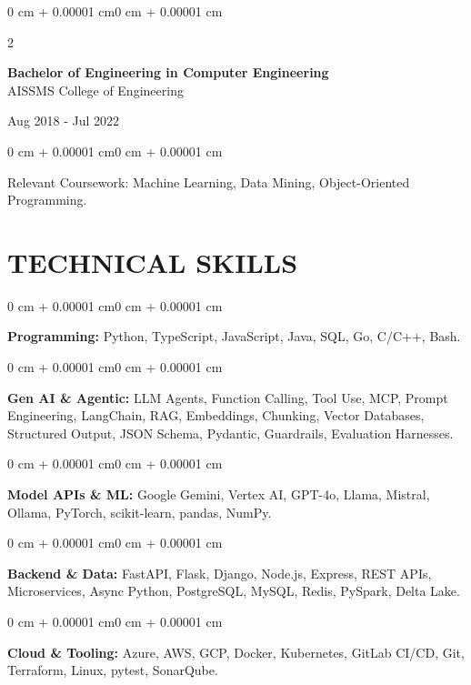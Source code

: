 \documentclass[10pt, letterpaper]{article}
\newenvironment{onecolentry}{
    \begin{adjustwidth}{0 cm + 0.00001 cm}{0 cm + 0.00001 cm}
}{
    \end{adjustwidth}
}
\newenvironment{twocolentry}[2][]{
    \onecolentry
    \def\secondColumn{#2}
    \setcolumnwidth{\fill, 4.5 cm}
    \begin{paracol}{2}
}{
    \switchcolumn \raggedleft \secondColumn
    \end{paracol}
    \endonecolentry
}
\begin{document}
\begin{twocolentry}{
    Aug 2018 - Jul 2022
}
    \textbf{Bachelor of Engineering in Computer Engineering} \\
    AISSMS College of Engineering
\end{twocolentry}
\begin{onecolentry}
Relevant Coursework: Machine Learning, Data Mining, Object-Oriented Programming.
\end{onecolentry}
\section{TECHNICAL SKILLS}
\begin{onecolentry}
\textbf{Programming:} Python, TypeScript, JavaScript, Java, SQL, Go, C/C++, Bash.
\end{onecolentry}
\vspace{0.06 cm}
\begin{onecolentry}
\textbf{Gen AI \& Agentic:} LLM Agents, Function Calling, Tool Use, MCP, Prompt Engineering, LangChain, RAG, Embeddings, Chunking, Vector Databases, Structured Output, JSON Schema, Pydantic, Guardrails, Evaluation Harnesses.
\end{onecolentry}
\vspace{0.06 cm}
\begin{onecolentry}
\textbf{Model APIs \& ML:} Google Gemini, Vertex AI, GPT-4o, Llama, Mistral, Ollama, PyTorch, scikit-learn, pandas, NumPy.
\end{onecolentry}
\vspace{0.06 cm}
\begin{onecolentry}
\textbf{Backend \& Data:} FastAPI, Flask, Django, Node.js, Express, REST APIs, Microservices, Async Python, PostgreSQL, MySQL, Redis, PySpark, Delta Lake.
\end{onecolentry}
\vspace{0.06 cm}
\begin{onecolentry}
\textbf{Cloud \& Tooling:} Azure, AWS, GCP, Docker, Kubernetes, GitLab CI/CD, Git, Terraform, Linux, pytest, SonarQube.
\end{onecolentry}

\end{document}
